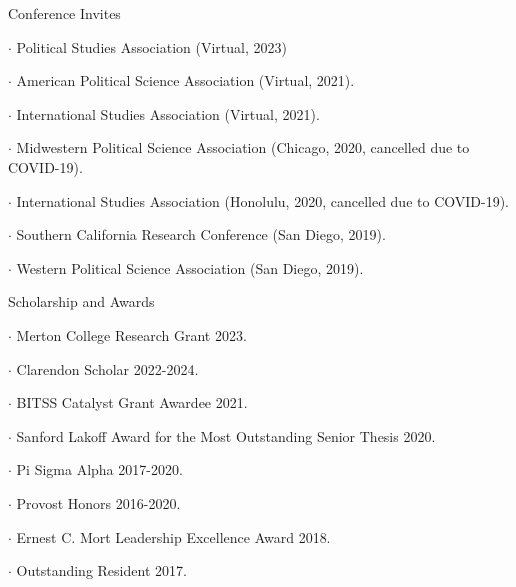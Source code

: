 \documentclass[10pt]{resume} %
\begin{document}
	\begin{rSection}{Conference Invites}
		\itemsep -5pt
		\item $\cdot$ Political Studies Association (Virtual, 2023)
		\item $\cdot$ American Political Science Association (Virtual, 2021).
		\item $\cdot$ International Studies Association (Virtual, 2021).
		\item $\cdot$ Midwestern Political Science Association (Chicago, 2020, cancelled due to COVID-19).
		\item $\cdot$ International Studies Association (Honolulu, 2020, cancelled due to COVID-19).
		\item $\cdot$ Southern California Research Conference (San Diego, 2019).
		\item $\cdot$ Western Political Science Association (San Diego, 2019).
	\end{rSection}
	
	\begin{rSection}{Scholarship and Awards}
		\itemsep -5pt
		\item $\cdot$ Merton College Research Grant 2023.
		\item $\cdot$ Clarendon Scholar 2022-2024.
		\item $\cdot$ BITSS Catalyst Grant Awardee 2021.
		\item $\cdot$ Sanford Lakoff Award for the Most Outstanding Senior Thesis 2020.
		\item $\cdot$ Pi Sigma Alpha 2017-2020. 
		\item $\cdot$ Provost Honors 2016-2020. 
		\item $\cdot$ Ernest C. Mort Leadership Excellence Award 2018. 
		\item $\cdot$ Outstanding Resident 2017.
	\end{rSection}
	
\end{document}
